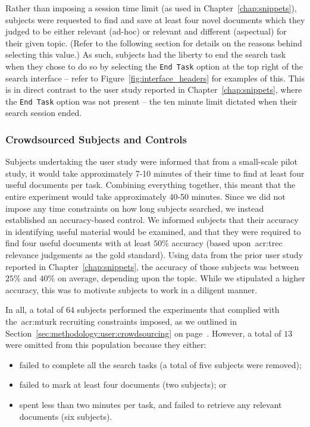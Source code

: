  Rather than imposing a session time limit (as used in Chapter~\ref{chap:snippets}), subjects were requested to find and save at least four novel documents which they judged to be either relevant (ad-hoc) or relevant and different (aspectual) for their given topic. (Refer to the following section for details on the reasons behind selecting this value.) As such, subjects had the liberty to end the search task when they chose to do so by selecting the \texttt{End Task} option at the top right of the search interface -- refer to Figure~\ref{fig:interface_headers} for examples of this. This is in direct contrast to the user study reported in Chapter~\ref{chap:snippets}, where the \texttt{End Task} option was not present -- the ten minute limit dictated when their search session ended.

\subsubsection{Crowdsourced Subjects and Controls}
Subjects undertaking the user study were informed that from a small-scale pilot study, it would take approximately 7-10 minutes of their time to find at least four useful documents per task. Combining everything together, this meant that the entire experiment would take approximately 40-50 minutes. Since we did not impose any time constraints on how long subjects searched, we instead established an accuracy-based control. We informed subjects that their accuracy in identifying useful material would be examined, and that they were required to find four useful documents with at least $50\%$ accuracy (based upon~\gls{acr:trec} relevance judgements as the gold standard). Using data from the prior user study reported in Chapter~\ref{chap:snippets}, the accuracy of those subjects was between $25\%$ and $40\%$ on average, depending upon the topic. While we stipulated a higher accuracy, this was to motivate subjects to work in a diligent manner.

In all, a total of $64$ subjects performed the experiments that complied with the~\gls{acr:mturk} recruiting constraints imposed, as we outlined in Section~\ref{sec:methodology:user:crowdsourcing} on page~\pageref{sec:methodology:user:crowdsourcing}. However, a total of $13$ were omitted from this population because they either:

\begin{itemize}
    \item{failed to complete all the search tasks (a total of five subjects were removed);}
    \item{failed to mark at least four documents (two subjects); or}
    \item{spent less than two minutes per task, and failed to retrieve any relevant documents (six subjects).}
\end{itemize}

